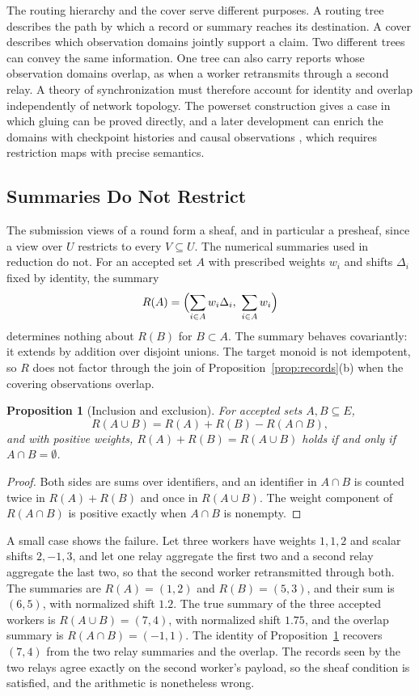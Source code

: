 \documentclass[11pt]{article}
\newtheorem{proposition}{Proposition}
\theoremstyle{definition}
\theoremstyle{remark}
\begin{document}
The routing hierarchy and the cover serve different purposes. A routing tree describes the path by which a record or summary reaches its destination. A cover describes which observation domains jointly support a claim. Two different trees can convey the same information. One tree can also carry reports whose observation domains overlap, as when a worker retransmits through a second relay. A theory of synchronization must therefore account for identity and overlap independently of network topology. The powerset construction gives a case in which gluing can be proved directly, and a later development can enrich the domains with checkpoint histories and causal observations \cite{lamport1978}, which requires restriction maps with precise semantics.

\subsection{Summaries Do Not Restrict}

The submission views of a round form a sheaf, and in particular a presheaf, since a view over $U$ restricts to every $V\subseteq U$. The numerical summaries used in reduction do not. For an accepted set $A$ with prescribed weights $w_i$ and shifts $\Delta_i$ fixed by identity, the summary
\[
R(A)=\Bigl(\sum_{i\in A}w_i\Delta_i,\ \sum_{i\in A}w_i\Bigr)
\]
determines nothing about $R(B)$ for $B\subset A$. The summary behaves covariantly: it extends by addition over disjoint unions. The target monoid is not idempotent, so $R$ does not factor through the join of Proposition~\ref{prop:records}(b) when the covering observations overlap.

\begin{proposition}[Inclusion and exclusion]\label{prop:inclexcl}
For accepted sets $A,B\subseteq E$,
\[
R(A\cup B)=R(A)+R(B)-R(A\cap B),
\]
and with positive weights, $R(A)+R(B)=R(A\cup B)$ holds if and only if $A\cap B=\emptyset$.
\end{proposition}

\begin{proof}
Both sides are sums over identifiers, and an identifier in $A\cap B$ is counted twice in $R(A)+R(B)$ and once in $R(A\cup B)$. The weight component of $R(A\cap B)$ is positive exactly when $A\cap B$ is nonempty.
\end{proof}

A small case shows the failure. Let three workers have weights $1,1,2$ and scalar shifts $2,-1,3$, and let one relay aggregate the first two and a second relay aggregate the last two, so that the second worker retransmitted through both. The summaries are $R(A)=(1,2)$ and $R(B)=(5,3)$, and their sum is $(6,5)$, with normalized shift $1.2$. The true summary of the three accepted workers is $R(A\cup B)=(7,4)$, with normalized shift $1.75$, and the overlap summary is $R(A\cap B)=(-1,1)$. The identity of Proposition~\ref{prop:inclexcl} recovers $(7,4)$ from the two relay summaries and the overlap. The records seen by the two relays agree exactly on the second worker's payload, so the sheaf condition is satisfied, and the arithmetic is nonetheless wrong.
\end{document}
